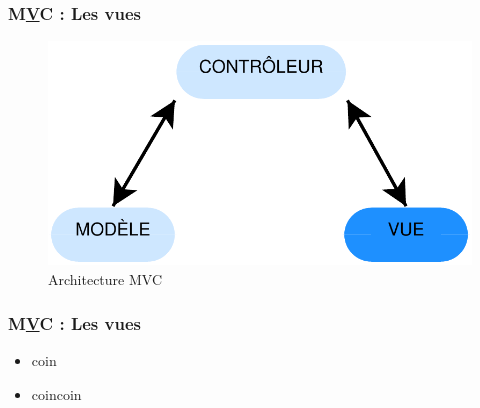 \speaker{\Mathieu}

\begin{frame}
\frametitle{M\underline{\textbf{V}}C : Les vues}
\begin{figure}[!h]
	\begin{center}
	\includegraphics[scale=0.5]{images/mvcVue}
	\caption{Architecture MVC}
	\end{center}
\end{figure}
\end{frame}

\begin{frame}
  \frametitle{M\underline{\textbf{V}}C : Les vues}
  \begin{itemize}
    \item coin
    \item coincoin
  \end{itemize}
\end{frame}
